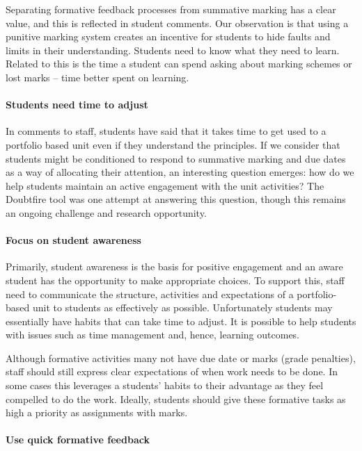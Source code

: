 Separating formative feedback processes from summative marking has a clear value, and this is reflected in student comments. Our observation is that using a punitive marking system creates an incentive for students to hide faults and limits in their understanding. Students need to know what they need to learn. Related to this is the time a student can spend asking about marking schemes or lost marks -- time better spent on learning.

\paragraph{Students need time to adjust}

In comments to staff, students have said that it takes time to get used to a portfolio based unit even if they understand the principles. If we consider that students might be conditioned to respond to summative marking and due dates as a way of allocating their attention, an interesting question emerges: how do we help students maintain an active engagement with the unit activities? The Doubtfire tool was one attempt at answering this question, though this remains an ongoing challenge and research opportunity.
 
\paragraph{Focus on student awareness}
 
Primarily, student awareness is the basis for positive engagement and an aware student has the opportunity to make appropriate choices. To support this, staff need to communicate the structure, activities and expectations of a portfolio-based unit to students as effectively as possible. Unfortunately students may essentially have habits that can take time to adjust. It is possible to help students with issues such as time management and, hence, learning outcomes.

Although formative activities many not have due date or marks (grade penalties), staff should still express clear expectations of when work needs to be done. In some cases this leverages a students' habits to their advantage as they feel compelled to do the work. Ideally, students should give these formative tasks as high a priority as assignments with marks.

\paragraph{Use quick formative feedback}

